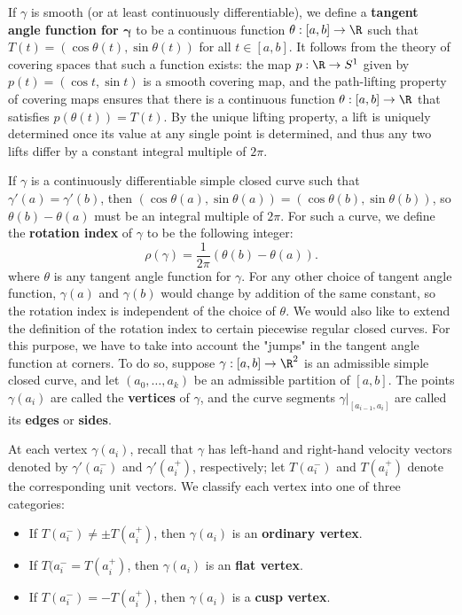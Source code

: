 If $\gamma$ is smooth (or at least continuously differentiable), we define a \textbf{tangent angle function for $\bm{\gamma}$} to be a continuous function $\theta:[a,b]\to\R$ 
such that $T(t)=(\cos\theta(t),\sin\theta(t))$ for all $t\in[a,b]$. It follows from the theory of covering spaces that such a function exists: the map $p:\R\to S^1$ 
given by $p(t)=(\cos t,\sin t)$ is a smooth covering map, and the path-lifting property of covering maps ensures that there is a continuous function $\theta:[a,b]\to\R$ 
that satisfies $p(\theta(t))=T(t)$. By the unique lifting property, a lift is uniquely determined once its value at any single point is determined, and thus any two 
lifts differ by a constant integral multiple of $2\pi$.\par
If $\gamma$ is a continuously differentiable simple closed curve such that $\gamma'(a)=\gamma'(b)$, then $(\cos\theta(a),\sin\theta(a))=(\cos\theta(b),\sin\theta(b))$, 
so $\theta(b)-\theta(a)$ must be an integral multiple of $2\pi$. For such a curve, we define the \textbf{rotation index} of $\gamma$ to be the following integer:
\[\rho(\gamma)=\frac{1}{2\pi}(\theta(b)-\theta(a)).\]
where $\theta$ is any tangent angle function for $\gamma$. For any other choice of tangent angle function, $\gamma(a)$ and $\gamma(b)$ would change by addition of the 
same constant, so the rotation index is independent of the choice of $\theta$.
We would also like to extend the definition of the rotation index to certain piecewise regular closed curves. For this purpose, we have to take into account the "jumps" 
in the tangent angle function at corners. To do so, suppose $\gamma:[a,b]\to\R^2$ is an admissible simple closed curve, and let $(a_0,\dots,a_k)$ be an admissible 
partition of $[a,b]$. The points $\gamma(a_i)$ are called the \textbf{vertices} of $\gamma$, and the curve segments $\gamma|_{[a_{i-1},a_i]}$ are called its \textbf{edges} or 
\textbf{sides}.\par
At each vertex  $\gamma(a_i)$, recall that $\gamma$ has left-hand and right-hand velocity vectors denoted by $\gamma'(a_i^{-})$ and $\gamma'(a_i^{+})$, respectively; 
let $T(a_i^{-})$ and $T(a_i^{+})$ denote the corresponding unit vectors. We classify each vertex into one of three categories:
\begin{itemize}
\item If $T(a_i^{-})\neq\pm T(a_i^{+})$, then $\gamma(a_i)$ is an \textbf{ordinary vertex}.
\item If $T(a_i^{-}=T(a_i^{+})$, then $\gamma(a_i)$ is an \textbf{flat vertex}.
\item If $T(a_i^{-})=-T(a_i^{+})$, then $\gamma(a_i)$ is a \textbf{cusp vertex}.
\end{itemize}
